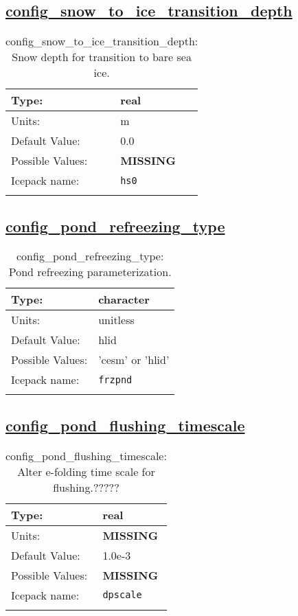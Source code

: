 \subsection[config\_snow\_to\_ice\_transition\_depth]{\hyperref[sec:nm_tab_meltponds]{config\_snow\_to\_ice\_transition\_depth}}
\label{subsec:nm_sec_config_snow_to_ice_transition_depth}
\begin{center}
\begin{longtable}{| p{2.0in} || p{4.0in} |}
    \hline
    Type: & real \\
    \hline
    Units: & \si{m} \\
    \hline
    Default Value: & 0.0 \\
    \hline
    Possible Values: & {\bf \color{red} MISSING} \\
    \hline
    Icepack name: & \verb+hs0+ \\
    \hline
    \caption{config\_snow\_to\_ice\_transition\_depth: Snow depth for transition to bare sea ice.}
\end{longtable}
\end{center}
\subsection[config\_pond\_refreezing\_type]{\hyperref[sec:nm_tab_meltponds]{config\_pond\_refreezing\_type}}
\label{subsec:nm_sec_config_pond_refreezing_type}
\begin{center}
\begin{longtable}{| p{2.0in} || p{4.0in} |}
    \hline
    Type: & character \\
    \hline
    Units: & \si{unitless} \\
    \hline
    Default Value: & hlid \\
    \hline
    Possible Values: & 'cesm' or 'hlid' \\
    \hline
    Icepack name: & \verb+frzpnd+ \\
    \hline
    \caption{config\_pond\_refreezing\_type: Pond refreezing parameterization.}
\end{longtable}
\end{center}
\subsection[config\_pond\_flushing\_timescale]{\hyperref[sec:nm_tab_meltponds]{config\_pond\_flushing\_timescale}}
\label{subsec:nm_sec_config_pond_flushing_timescale}
\begin{center}
\begin{longtable}{| p{2.0in} || p{4.0in} |}
    \hline
    Type: & real \\
    \hline
    Units: & {\bf \color{red} MISSING} \\
    \hline
    Default Value: & 1.0e-3 \\
    \hline
    Possible Values: & {\bf \color{red} MISSING} \\
    \hline
    Icepack name: & \verb+dpscale+ \\
    \hline
    \caption{config\_pond\_flushing\_timescale: Alter e-folding time scale for flushing.?????}
\end{longtable}
\end{center}
